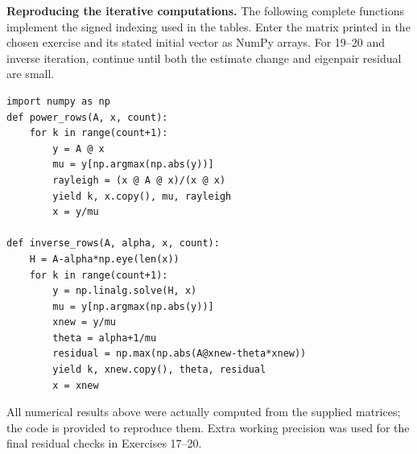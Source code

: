 \textbf{Reproducing the iterative computations.}
The following complete functions implement the signed indexing used
in the tables. Enter the matrix printed in the chosen exercise and its
stated initial vector as NumPy arrays. For 19--20 and inverse iteration,
continue until both the estimate change and eigenpair residual are small.
\begin{verbatim}
import numpy as np
def power_rows(A, x, count):
    for k in range(count+1):
        y = A @ x
        mu = y[np.argmax(np.abs(y))]
        rayleigh = (x @ A @ x)/(x @ x)
        yield k, x.copy(), mu, rayleigh
        x = y/mu

def inverse_rows(A, alpha, x, count):
    H = A-alpha*np.eye(len(x))
    for k in range(count+1):
        y = np.linalg.solve(H, x)
        mu = y[np.argmax(np.abs(y))]
        xnew = y/mu
        theta = alpha+1/mu
        residual = np.max(np.abs(A@xnew-theta*xnew))
        yield k, xnew.copy(), theta, residual
        x = xnew
\end{verbatim}
All numerical results above were actually computed from the supplied
matrices; the code is provided to reproduce them. Extra working precision
was used for the final residual checks in Exercises 17--20.
